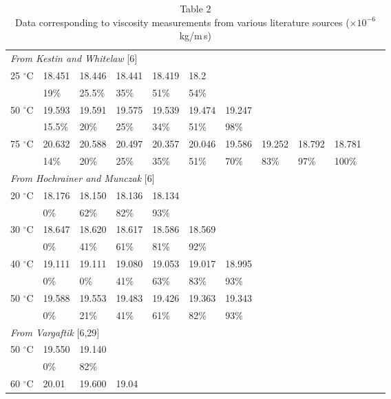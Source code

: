\documentclass[11pt]{article}
\newcommand{\degC}{$^{\circ}$C}
\begin{document}
\begin{table}[htbp]
\centering
\footnotesize
\caption*{Table 2\\ Data corresponding to viscosity measurements from
          various literature sources ($\times10^{-6}$ kg/m\,s)}
\setlength{\tabcolsep}{4pt}
\begin{tabular}{llllllllllll}
\toprule
\multicolumn{12}{l}{\textit{From Kestin and Whitelaw} [6]} \\
25 \degC & 18.451 & 18.446 & 18.441 & 18.419 & 18.2 & & & & & & \\
         & 19\%   & 25.5\% & 35\%   & 51\%   & 54\% & & & & & & \\
50 \degC & 19.593 & 19.591 & 19.575 & 19.539 & 19.474 & 19.247 & & & & & \\
         & 15.5\% & 20\%   & 25\%   & 34\%   & 51\%   & 98\%   & & & & & \\
75 \degC & 20.632 & 20.588 & 20.497 & 20.357 & 20.046 & 19.586 & 19.252 & 18.792 & 18.781 & & \\
         & 14\%   & 20\%   & 25\%   & 35\%   & 51\%   & 70\%   & 83\%   & 97\%   & 100\%  & & \\
\midrule
\multicolumn{12}{l}{\textit{From Hochrainer and Munczak} [6]} \\
20 \degC & 18.176 & 18.150 & 18.136 & 18.134 & & & & & & & \\
         & 0\%    & 62\%   & 82\%   & 93\%   & & & & & & & \\
30 \degC & 18.647 & 18.620 & 18.617 & 18.586 & 18.569 & & & & & & \\
         & 0\%    & 41\%   & 61\%   & 81\%   & 92\%   & & & & & & \\
40 \degC & 19.111 & 19.111 & 19.080 & 19.053 & 19.017 & 18.995 & & & & & \\
         & 0\%    & 0\%    & 41\%   & 63\%   & 83\%   & 93\%   & & & & & \\
50 \degC & 19.588 & 19.553 & 19.483 & 19.426 & 19.363 & 19.343 & & & & & \\
         & 0\%    & 21\%   & 41\%   & 61\%   & 82\%   & 93\%   & & & & & \\
\midrule
\multicolumn{12}{l}{\textit{From Vargaftik} [6,29]} \\
50 \degC  & 19.550 & 19.140 & & & & & & & & & \\
          & 0\%    & 82\%   & & & & & & & & & \\
60 \degC  & 20.01  & 19.600 & 19.04 & & & & & & & & \\

\end{tabular}
\end{table}
\end{document}
